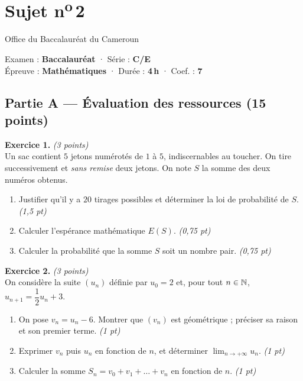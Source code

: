 \section{Sujet n\textsuperscript{o}\,2}
\noindent\begin{minipage}{0.5\linewidth}\footnotesize Office du Baccalauréat du Cameroun\end{minipage}%
\hfill\begin{minipage}{0.45\linewidth}\footnotesize\raggedleft Examen : \textbf{Baccalauréat} · Série : \textbf{C/E}\\
Épreuve : \textbf{Mathématiques} · Durée : \textbf{4\,h} · Coef. : \textbf{7}\end{minipage}
\par\smallskip{\color{onbo}\rule{\linewidth}{1pt}}

\subsection*{Partie A — Évaluation des ressources \hfill (15 points)}

\noindent\textbf{Exercice 1.} \hfill\textit{(3 points)}\\
Un sac contient $5$ jetons numérotés de $1$ à $5$, indiscernables au toucher. On tire
successivement et \emph{sans remise} deux jetons. On note $S$ la somme des deux numéros obtenus.
\begin{enumerate}[label=\arabic*)]
\item Justifier qu'il y a $20$ tirages possibles et déterminer la loi de probabilité de $S$. \hfill\textit{(1,5 pt)}
\item Calculer l'espérance mathématique $E(S)$. \hfill\textit{(0,75 pt)}
\item Calculer la probabilité que la somme $S$ soit un nombre pair. \hfill\textit{(0,75 pt)}
\end{enumerate}

\smallskip
\noindent\textbf{Exercice 2.} \hfill\textit{(3 points)}\\
On considère la suite $(u_n)$ définie par $u_0=2$ et, pour tout $n\in\mathbb{N}$, $u_{n+1}=\dfrac{1}{2}u_n+3$.
\begin{enumerate}[label=\arabic*)]
\item On pose $v_n=u_n-6$. Montrer que $(v_n)$ est géométrique ; préciser sa raison et son premier terme. \hfill\textit{(1 pt)}
\item Exprimer $v_n$ puis $u_n$ en fonction de $n$, et déterminer $\displaystyle\lim_{n\to+\infty}u_n$. \hfill\textit{(1 pt)}
\item Calculer la somme $S_n=v_0+v_1+\dots+v_n$ en fonction de $n$. \hfill\textit{(1 pt)}
\end{enumerate}

